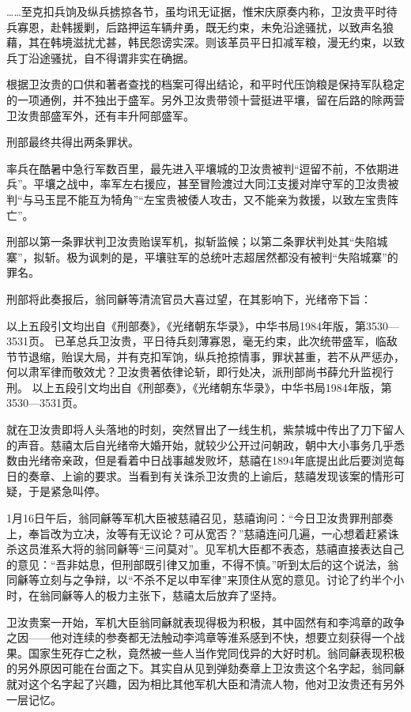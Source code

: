\documentclass[12pt,UTF8]{ctexbook}
\begin{document}
……至克扣兵饷及纵兵掳掠各节，虽均讯无证据，惟宋庆原奏内称，卫汝贵平时待兵寡恩，赴韩援剿，后路押运车辆弁勇，既无约束，未免沿途骚扰，以致声名狼藉，其在韩境滋扰尤甚，韩民怨谤实深。则该革员平日扣减军粮，漫无约束，以致兵丁沿途骚扰，自不得谓非实在确据。

根据卫汝贵的口供和著者查找的档案可得出结论，和平时代压饷粮是保持军队稳定的一项通例，并不独出于盛军。另外卫汝贵带领十营挺进平壤，留在后路的除两营卫汝贵部盛军外，还有丰升阿部盛军。

刑部最终共得出两条罪状。

率兵在酷暑中急行军数百里，最先进入平壤城的卫汝贵被判“逗留不前，不依期进兵”。平壤之战中，率军左右援应，甚至冒险渡过大同江支援对岸守军的卫汝贵被判“与马玉昆不能互为犄角”“左宝贵被倭人攻击，又不能亲为救援，以致左宝贵阵亡”。

刑部以第一条罪状判卫汝贵贻误军机，拟斩监候；以第二条罪状判处其“失陷城寨”，拟斩。极为讽刺的是，平壤驻军的总统叶志超居然都没有被判“失陷城寨”的罪名。

刑部将此奏报后，翁同龢等清流官员大喜过望，在其影响下，光绪帝下旨：

以上五段引文均出自《刑部奏》，《光绪朝东华录》，中华书局1984年版，第3530—3531页。
已革总兵卫汝贵，平日待兵刻薄寡恩，毫无约束，此次统带盛军，临敌节节退缩，贻误大局，并有克扣军饷，纵兵抢掠情事，罪状甚重，若不从严惩办，何以肃军律而敬效尤？卫汝贵著依律论斩，即行处决，派刑部尚书薛允升监视行刑。 以上五段引文均出自《刑部奏》，《光绪朝东华录》，中华书局1984年版，第3530—3531页。

就在卫汝贵即将人头落地的时刻，突然冒出了一线生机，紫禁城中传出了刀下留人的声音。慈禧太后自光绪帝大婚开始，就较少公开过问朝政，朝中大小事务几乎悉数由光绪帝亲政，但是看着中日战事越发败坏，慈禧在1894年底提出此后要浏览每日的奏章、上谕的要求。当看到有关诛杀卫汝贵的上谕后，慈禧发现该案的情形可疑，于是紧急叫停。

1月16日午后，翁同龢等军机大臣被慈禧召见，慈禧询问：“今日卫汝贵罪刑部奏上，奉旨改为立决，汝等有无议论？可从宽否？”慈禧连问几遍，一心想着赶紧诛杀这员淮系大将的翁同龢等“三问莫对”。见军机大臣都不表态，慈禧直接表达自己的意见：“吾非姑息，但刑部既引律又加重，不得不慎。”听到太后的这个说法，翁同龢等立刻与之争辩，以“不杀不足以申军律”来顶住从宽的意见。讨论了约半个小时，在翁同龢等人的极力主张下，慈禧太后放弃了坚持。

卫汝贵案一开始，军机大臣翁同龢就表现得极为积极，其中固然有和李鸿章的政争之因——他对连续的参奏都无法触动李鸿章等淮系感到不快，想要立刻获得一个战果。国家生死存亡之秋，竟然被一些人当作党同伐异的大好时机。翁同龢表现积极的另外原因可能在台面之下。其实自从见到弹劾奏章上卫汝贵这个名字起，翁同龢就对这个名字起了兴趣，因为相比其他军机大臣和清流人物，他对卫汝贵还有另外一层记忆。
\end{document}
